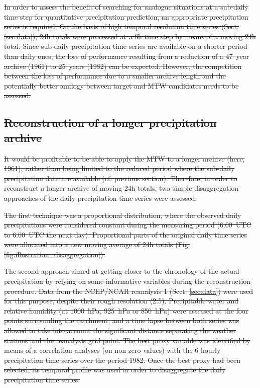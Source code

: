 \documentclass[hess, manuscript]{copernicus}
\providecommand{\DIFdel}[1]{{\protect\color{red}\sout{#1}}}                      %
\providecommand{\DIFdelbegin}{} %
\begin{document}
	\DIFdelbegin \DIFdel{In order to assess the benefit of searching for analogue situations at a sub-daily time step for quantitative precipitation prediction, an appropriate precipitation series is required. On the basis of high temporal resolution time series (Sect. \ref{sec:data}), 24h totals were processed at a 6h time step by means of a moving 24h total. Since sub-daily precipitation time series are available on a shorter period than daily ones, the loss of performance resulting from a reduction of a 47~year archive (1961\textendash 2008) to 25~years (1982\textendash 2007) can be expected. However, the competition between the loss of performance due to a smaller archive length and the potentially better analogy between target and MTW candidates needs to be assessed.
	}%

\subsection{\DIFdel{Reconstruction of a longer precipitation archive}}
\addtocounter{subsection}{-1}%

\DIFdel{It would be profitable to be able to apply the MTW to a longer archive (here, 1961\textendash 2008), rather than being limited to the reduced period where the sub-daily precipitation data are available (cf. previous section). Therefore, in order to reconstruct a longer archive of moving 24h totals, two simple disaggregation approaches of the daily precipitation time series were assessed.
		}%

\DIFdel{The first technique was a proportional distribution, where the observed daily precipitations were considered constant during the measuring period (6:00~UTC to 6:00~UTC the next day). Proportional parts of the original daily time series were allocated into a new moving average of 24h totals (Fig. \ref{fig:illustration_disaggregation}). 
	}%

\DIFdel{The second approach aimed at getting closer to the chronology of the actual precipitation by relying on some informative variables during the reconstruction procedure. Data from the NCEP/NCAR reanalysis 1 (Sect. \ref{sec:data}) were used for this purpose, despite their rough resolution (2.5\textdegree). Precipitable water and relative humidity (at 1000~hPa, 925~hPa or 850~hPa) were assessed at the four points surrounding the catchment, and a time lapse between both series was allowed to take into account the significant distance separating the weather stations and the reanalysis grid point. The best proxy variable was identified by means of a correlation analyses (on non-zero values) with the 6-hourly precipitation time series over the period 1982\textendash 2007. Once the best proxy had been selected, its temporal profile was used in order to disaggregate the daily precipitation time series.
	}%
\end{document}
